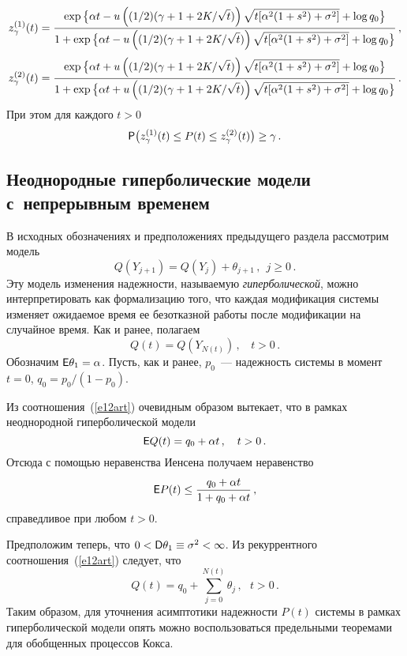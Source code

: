 $$
z^{(1)}_{\gamma}(t)=\displaystyle\frac{\displaystyle \exp\big\{\alpha
t-u\left ((1/2)(\gamma+1+2K/\sqrt{t})\right)
\sqrt{t[\alpha^2(1+s^2)+\sigma^2]}+\log
q_0\big\}\mathstrut}{\displaystyle 1+\exp\big\{\alpha
t-u\left((1/2)(\gamma+1+2K/\sqrt{t})\right )
\sqrt{t[\alpha^2(1+s^2)+\sigma^2]}+\log q_0\big\}\mathstrut}\,,
$$
$$
z^{(2)}_{\gamma}(t)=\displaystyle\frac{\displaystyle \exp\big\{\alpha
t+u\left ((1/2)(\gamma+1+2K/\sqrt{t})\right)
\sqrt{t[\alpha^2(1+s^2)+\sigma^2]}+\log
q_0\big\}\mathstrut}{\displaystyle 1+\exp\big\{\alpha
t+u\left ((1/2)(\gamma+1+2K/\sqrt{t})\right )
\sqrt{t[\alpha^2(1+s^2)+\sigma^2]}+\log q_0\big\}\mathstrut}\,.
$$
При этом для каждого $t>0$
$$
{\sf P}\big(z^{(1)}_{\gamma}(t)\le P(t)\le
z^{(2)}_{\gamma}(t)\big)\ge\gamma\,.
$$

\begin{multicols}{2}
\section{Неоднородные гиперболические модели с~непрерывным временем}

В исходных обозначениях и предположениях предыдущего раздела
рассмотрим модель
\begin{equation}
Q(Y_{j+1})=Q(Y_j)+\theta_{j+1}\,,\ \ j\ge0\,.\label{e12art}
\end{equation}
Эту модель изменения надежности, называемую {\it гиперболической},
можно интерпретировать как формализацию того, что каждая
модификация системы изменяет ожидаемое время ее безотказной работы
после модификации на случайное время. Как и ранее, полагаем
$$
Q(t)=Q(Y_{N(t)})\,,\ \ \ \ t>0\,.
$$
Обозначим ${\sf E}\theta_1=\alpha$. Пусть, как и ранее, $p_0$~---
надежность системы в момент $t=0$, $q_0=p_0/(1-p_0)$.

\smallskip

Из соотношения~(\ref{e12art}) очевидным образом вытекает, что в рамках
неоднородной гиперболической модели
$$
{\sf E}Q(t)=q_0+\alpha t\,,\ \ \ t>0\,.
$$
Отсюда с помощью неравенства Иенсена получаем неравенство
$$
{\sf E}P(t)\le\displaystyle\frac{\displaystyle q_0+\alpha t\mathstrut}{\displaystyle 1+q_0+\alpha t\mathstrut}\,,
$$
справедливое при любом $t>0$.

\smallskip

Предположим теперь, что $0<{\sf D}\theta_1\equiv\sigma^2<\infty$.
Из рекуррентного соотношения~(\ref{e12art}) следует, что
$$
Q(t)=q_0+\sum_{j=0}^{N(t)}\theta_j\,, \ \ \ t>0\,.
$$
Таким образом, для уточнения асимптотики надежности $P(t)$ системы
в рамках гиперболической модели опять можно воспользоваться
предельными теоремами для обобщенных процессов \mbox{Кокса.}
{

}


\end{multicols}
